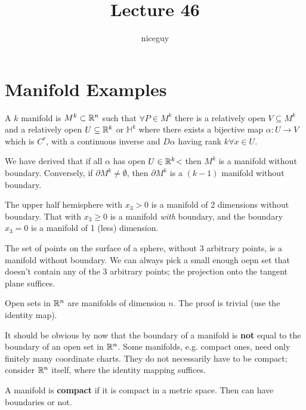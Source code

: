 \documentclass[12pt]{article}
\title{Lecture 46}
\author{niceguy}
\begin{document}
\maketitle

\section{Manifold Examples}

\begin{defn}[Manifolds]
    A $k$ manifold is $M^k \subset \mathbb{R}^n$ such that $\forall P \in M^k$ there is a relatively open $V \subseteq M^k$ and a relatively open $U \subseteq \mathbb{R}^k$ or $\mathbb H^k$ where there exists a bijective map $\alpha: U \rightarrow V$ which is $C^r$, with a continuous inverse and $D\alpha$ having rank $k \forall x \in U$.
\end{defn}

We have derived that if all $\alpha$ has open $U \in \mathbb{R}^k$< then $M^k$ is a manifold without boundary. Conversely, if $\partial M^k \neq \emptyset$, then $\partial M^k$ is a $(k-1)$ manifold without boundary.

\begin{ex}
    The upper half hemisphere with $x_3 > 0$ is a manifold of 2 dimensions without boundary. That with $x_3 \geq 0$ is a manifold \textit{with} boundary, and the boundary $x_3 = 0$ is a manifold of 1 (less) dimension.
\end{ex}

\begin{ex}
    The set of points on the surface of a sphere, without 3 arbitrary points, is a manifold without boundary. We can always pick a small enough oepn set that doesn't contain any of the 3 arbitrary points; the projection onto the tangent plane suffices.
\end{ex}

\begin{ex}
    Open sets in $\mathbb{R}^n$ are manifolds of dimension $n$. The proof is trivial (use the identity map).
\end{ex}

It should be obvious by now that the boundary of a manifold is \textbf{not} equal to the boundary of an open set in $\mathbb{R}^n$. Some manifolds, e.g. compact ones, need only finitely many coordinate charts. They do not necessarily have to be compact; consider $\mathbb{R}^n$ itself, where the identity mapping suffices.

\begin{defn}[Compactness]
    A manifold is \textbf{compact} if it is compact in a metric space. Then can have boundaries or not.
\end{defn}
\end{document}
